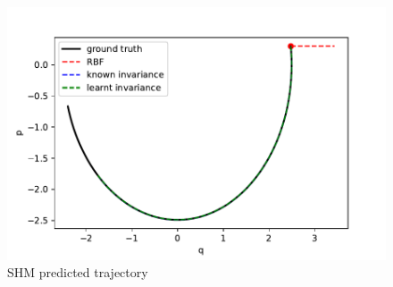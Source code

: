 \documentclass{statsmsc}
\begin{document}
\begin{figure}[H]
        \centering
        \includegraphics[width=\linewidth]{../codes/figures/shm_predicted.pdf}
        \caption{SHM predicted trajectory}
        \label{fig:shm_prediction}
\end{figure}
\end{document}
